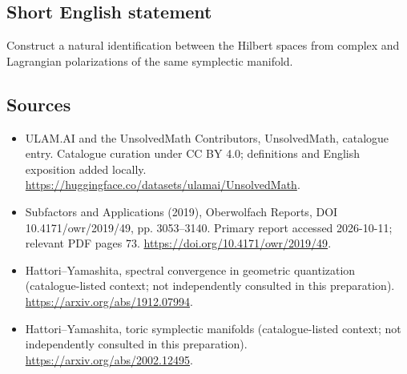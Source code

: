 \documentclass[11pt]{article}
\begin{document}
\subsection{Short English statement}
Construct a natural identification between the Hilbert spaces from complex and Lagrangian polarizations of the same symplectic manifold.
\subsection{Sources}
\begin{itemize}
\item[\hypertarget{source:statement:1}{S1}] ULAM.AI and the UnsolvedMath Contributors, UnsolvedMath, catalogue entry. Catalogue curation under CC BY 4.0; definitions and English exposition added locally.
\url{https://huggingface.co/datasets/ulamai/UnsolvedMath}.
\item[\hypertarget{source:statement:2}{S2}] Subfactors and Applications (2019), Oberwolfach Reports, DOI 10.4171/owr/2019/49, pp. 3053--3140. Primary report accessed 2026-10-11; relevant PDF pages 73.
\url{https://doi.org/10.4171/owr/2019/49}.
\item[\hypertarget{source:statement:3}{S3}] Hattori--Yamashita, spectral convergence in geometric quantization (catalogue-listed context; not independently consulted in this preparation).
\url{https://arxiv.org/abs/1912.07994}.
\item[\hypertarget{source:statement:4}{S4}] Hattori--Yamashita, toric symplectic manifolds (catalogue-listed context; not independently consulted in this preparation).
\url{https://arxiv.org/abs/2002.12495}.
\end{itemize}
\label{end:statement}
\end{document}
